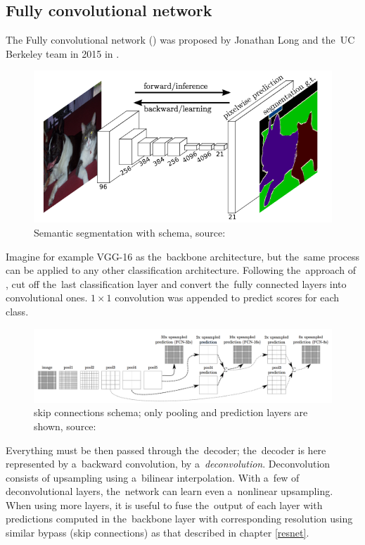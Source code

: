 \subsection{Fully convolutional network}
\label{fcns}

The Fully convolutional network () was proposed by Jonathan Long and
the~UC Berkeley team in 2015 in \cite{fcns}.

\begin{figure}[H]
   \centering
	\includegraphics[width=.8\linewidth]{./pictures/fcns.png}
	\caption[Fully convolutional network]{Semantic segmentation with  
schema, source: \cite{fcns}}
      \label{fig:fcns}
\end{figure}

Imagine for example VGG-16 as the~backbone architecture, but the~same process 
can be applied to any other classification architecture. Following the~approach 
of \cite{fcns}, cut off the~last classification layer and convert the~fully 
connected layers into convolutional ones. $1 \times 1$ convolution was appended 
to predict scores for each class. 

\begin{figure}[H]
   \centering
	\includegraphics[width=\linewidth]{./pictures/fcns-bypass.png}
	\caption[Bypass in Fully convolutional network]{ skip connections 
schema; only pooling and prediction layers are shown, source: \cite{fcns}}
      \label{fig:fcns-bypass}
\end{figure}

Everything must be then passed through the~decoder; the~decoder is here 
represented by a~backward convolution, by a~\textit{deconvolution}. 
Deconvolution consists of upsampling using a~bilinear interpolation. With a~few 
of deconvolutional layers, the~network can learn even a~nonlinear upsampling. 
When using more layers, it is useful to fuse the~output of each layer with 
predictions computed in the~backbone layer with corresponding resolution using 
similar bypass (skip connections) as that described in chapter \ref{resnet}.

